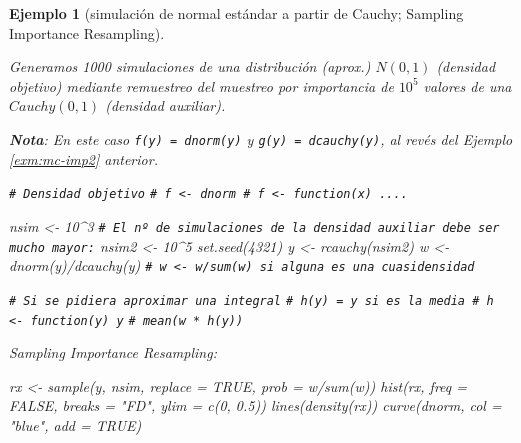 \documentclass[
  10pt,
]{book}
\newenvironment{Shaded}{\begin{snugshade}}{\end{snugshade}}
\newcommand{\AttributeTok}[1]{\textcolor[rgb]{0.77,0.63,0.00}{#1}}
\newcommand{\CommentTok}[1]{\textcolor[rgb]{0.56,0.35,0.01}{\textit{#1}}}
\newcommand{\ConstantTok}[1]{\textcolor[rgb]{0.00,0.00,0.00}{#1}}
\newcommand{\DecValTok}[1]{\textcolor[rgb]{0.00,0.00,0.81}{#1}}
\newcommand{\FloatTok}[1]{\textcolor[rgb]{0.00,0.00,0.81}{#1}}
\newcommand{\FunctionTok}[1]{\textcolor[rgb]{0.00,0.00,0.00}{#1}}
\newcommand{\NormalTok}[1]{#1}
\newcommand{\OtherTok}[1]{\textcolor[rgb]{0.56,0.35,0.01}{#1}}
\newcommand{\SpecialCharTok}[1]{\textcolor[rgb]{0.00,0.00,0.00}{#1}}
\newcommand{\StringTok}[1]{\textcolor[rgb]{0.31,0.60,0.02}{#1}}
\theoremstyle{break}
\newtheorem{example}{Ejemplo}[chapter]
\theoremstyle{nonumberplain}
\renewcommand{\CommentTok}[1]{\textcolor[rgb]{0.41,0.41,0.41}{\texttt{#1}}}
\begin{document}
\begin{example}[simulación de normal estándar a partir de Cauchy; Sampling Importance Resampling]
\protect\hypertarget{exm:mc-imp-sample}{}\label{exm:mc-imp-sample}

Generamos 1000 simulaciones de una distribución (aprox.) \(N(0,1)\) (densidad objetivo) mediante remuestreo del muestreo por importancia de \(10^{5}\) valores de una \(Cauchy(0,1)\) (densidad auxiliar).

\textbf{Nota}: En este caso \texttt{f(y)\ =\ dnorm(y)} y \texttt{g(y)\ =\ dcauchy(y)}, al revés del Ejemplo \ref{exm:mc-imp2} anterior.

\begin{Shaded}
\begin{Highlighting}[]
\CommentTok{\# Densidad objetivo}
\CommentTok{\# f \textless{}{-} dnorm \# f \textless{}{-} function(x) ....}

\NormalTok{nsim }\OtherTok{\textless{}{-}} \DecValTok{10}\SpecialCharTok{\^{}}\DecValTok{3}
\CommentTok{\# El nº de simulaciones de la densidad auxiliar debe ser mucho mayor:}
\NormalTok{nsim2 }\OtherTok{\textless{}{-}} \DecValTok{10}\SpecialCharTok{\^{}}\DecValTok{5}
\FunctionTok{set.seed}\NormalTok{(}\DecValTok{4321}\NormalTok{)}
\NormalTok{y }\OtherTok{\textless{}{-}} \FunctionTok{rcauchy}\NormalTok{(nsim2)}
\NormalTok{w }\OtherTok{\textless{}{-}} \FunctionTok{dnorm}\NormalTok{(y)}\SpecialCharTok{/}\FunctionTok{dcauchy}\NormalTok{(y) }\CommentTok{\# w \textless{}{-} w/sum(w) si alguna es una cuasidensidad}

\CommentTok{\# Si se pidiera aproximar una integral}
\CommentTok{\# h(y) = y si es la media \# h \textless{}{-} function(y) y}
\CommentTok{\# mean(w * h(y))}
\end{Highlighting}
\end{Shaded}

Sampling Importance Resampling:

\begin{Shaded}
\begin{Highlighting}[]
\NormalTok{rx }\OtherTok{\textless{}{-}} \FunctionTok{sample}\NormalTok{(y, nsim, }\AttributeTok{replace =} \ConstantTok{TRUE}\NormalTok{, }\AttributeTok{prob =}\NormalTok{ w}\SpecialCharTok{/}\FunctionTok{sum}\NormalTok{(w))}
\FunctionTok{hist}\NormalTok{(rx, }\AttributeTok{freq =} \ConstantTok{FALSE}\NormalTok{, }\AttributeTok{breaks =} \StringTok{"FD"}\NormalTok{, }\AttributeTok{ylim =} \FunctionTok{c}\NormalTok{(}\DecValTok{0}\NormalTok{, }\FloatTok{0.5}\NormalTok{))}
\FunctionTok{lines}\NormalTok{(}\FunctionTok{density}\NormalTok{(rx))}
\FunctionTok{curve}\NormalTok{(dnorm, }\AttributeTok{col =} \StringTok{"blue"}\NormalTok{, }\AttributeTok{add =} \ConstantTok{TRUE}\NormalTok{)}
\end{Highlighting}
\end{Shaded}


\end{example}
\end{document}
